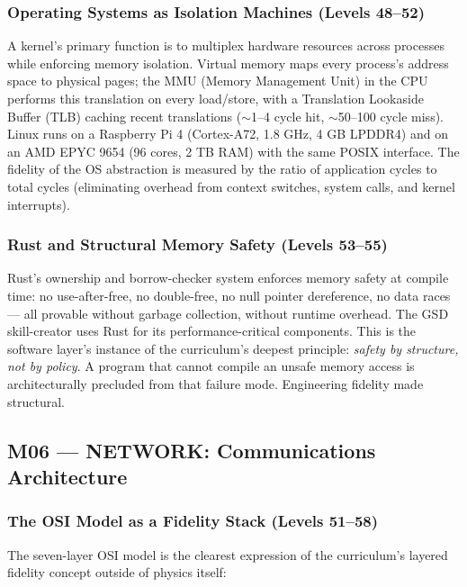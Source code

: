 \documentclass[11pt,letterpaper]{article}
\begin{document}
\subsubsection{Operating Systems as Isolation Machines (Levels 48--52)}

A kernel's primary function is to multiplex hardware resources across processes while enforcing
memory isolation. Virtual memory maps every process's address space to physical pages; the MMU
(Memory Management Unit) in the CPU performs this translation on every load/store, with a
Translation Lookaside Buffer (TLB) caching recent translations ($\sim$1--4 cycle hit,
$\sim$50--100 cycle miss). Linux runs on a Raspberry Pi 4 (Cortex-A72, 1.8 GHz, 4 GB LPDDR4)
and on an AMD EPYC 9654 (96 cores, 2 TB RAM) with the same POSIX interface. The fidelity of the
OS abstraction is measured by the ratio of application cycles to total cycles (eliminating
overhead from context switches, system calls, and kernel interrupts).

\subsubsection{Rust and Structural Memory Safety (Levels 53--55)}

Rust's ownership and borrow-checker system enforces memory safety at compile time: no
use-after-free, no double-free, no null pointer dereference, no data races --- all provable
without garbage collection, without runtime overhead. The GSD skill-creator uses Rust for its
performance-critical components. This is the software layer's instance of the curriculum's deepest
principle: \textit{safety by structure, not by policy}. A program that cannot compile an unsafe
memory access is architecturally precluded from that failure mode. Engineering fidelity made
structural.

\subsection{M06 --- NETWORK: Communications Architecture}

\subsubsection{The OSI Model as a Fidelity Stack (Levels 51--58)}

The seven-layer OSI model is the clearest expression of the curriculum's layered fidelity concept
outside of physics itself:
\end{document}
